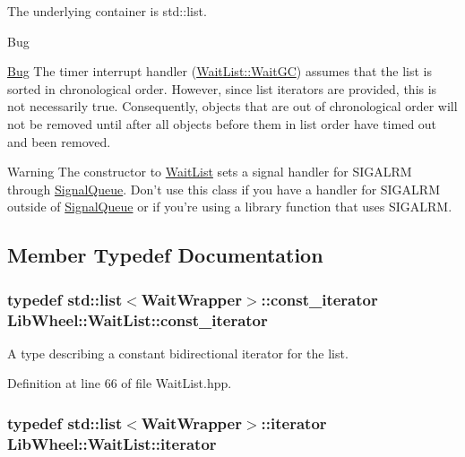 \-The underlying container is std\-::list.

\begin{DoxyRefDesc}{\-Bug}
\item[\hyperlink{bug__bug000006}{\-Bug}]\-The timer interrupt handler (\hyperlink{classLibWheel_1_1WaitList_1_1WaitGC}{\-Wait\-List\-::\-Wait\-G\-C}) assumes that the list is sorted in chronological order. \-However, since list iterators are provided, this is not necessarily true. \-Consequently, objects that are out of chronological order will not be removed until after all objects before them in list order have timed out and been removed.\end{DoxyRefDesc}


\begin{DoxyWarning}{\-Warning}
\-The constructor to \hyperlink{classLibWheel_1_1WaitList}{\-Wait\-List} sets a signal handler for \-S\-I\-G\-A\-L\-R\-M through \hyperlink{classLibWheel_1_1SignalQueue}{\-Signal\-Queue}. \-Don't use this class if you have a handler for \-S\-I\-G\-A\-L\-R\-M outside of \hyperlink{classLibWheel_1_1SignalQueue}{\-Signal\-Queue} or if you're using a library function that uses \-S\-I\-G\-A\-L\-R\-M. 
\end{DoxyWarning}


\subsection{\-Member \-Typedef \-Documentation}
\hypertarget{classLibWheel_1_1WaitList_a016ac87f7ff3d47c628a091581baa840}{
\subsubsection[{const\-\_\-iterator}]{\setlength{\rightskip}{0pt plus 5cm}typedef std\-::list$<${\bf \-Wait\-Wrapper}$>$\-::{\bf const\-\_\-iterator} {\bf \-Lib\-Wheel\-::\-Wait\-List\-::const\-\_\-iterator}}}
\label{classLibWheel_1_1WaitList_a016ac87f7ff3d47c628a091581baa840}


\-A type describing a constant bidirectional iterator for the list. 



\-Definition at line 66 of file \-Wait\-List.\-hpp.

\hypertarget{classLibWheel_1_1WaitList_a197f2582847b549a89b833d2eb153b1c}{
\subsubsection[{iterator}]{\setlength{\rightskip}{0pt plus 5cm}typedef std\-::list$<${\bf \-Wait\-Wrapper}$>$\-::{\bf iterator} {\bf \-Lib\-Wheel\-::\-Wait\-List\-::iterator}}}
\label{classLibWheel_1_1WaitList_a197f2582847b549a89b833d2eb153b1c}


